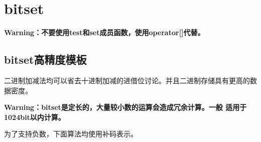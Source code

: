 \section{bitset}
{\bfseries Warning：不要使用test和set成员函数，使用operator[]代替。}

\subsection{bitset高精度模板}
二进制加减法均可以省去十进制加减的进借位讨论。并且二进制存储具有更高的数据密度。

{\bfseries Warning：bitset是定长的，大量较小数的运算会造成冗余计算。一般
适用于1024bit以内计算。}

为了支持负数，下面算法均使用补码表示。
